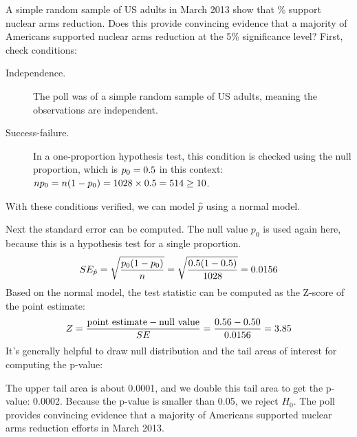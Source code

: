 \begin{examplewrap}
\begin{nexample}{A simple random sample of
    \gallupnucleararmspollsize{} US adults
    in March 2013 show that
    \gallupnucleararmspollpercent{}\% support nuclear arms
    reduction.
    Does this provide convincing evidence that a majority
    of Americans supported nuclear arms reduction at the
    5\% significance level?} \label{NuclearArmsInferenceExample}
  First, check conditions:
  \begin{description}
  \item[Independence.] The poll was of a simple random sample
      of US adults, meaning the observations are independent.
  \item[Success-failure.] In a one-proportion hypothesis test,
      this condition is checked using the null proportion,
      which is $p_0 = 0.5{}$
      in this context:
      $n p_0 = n (1 - p_0)
          = 1028{} \times
              0.5{}
          = 514{} \geq 10$.
  \end{description}
  With these conditions verified,
  we can model $\hat{p}$ using a normal model.

  Next the standard error can be computed.
  The null value $p_0$ is used again here,
  because this is a hypothesis test for a single proportion.
  \begin{align*}
  SE_{\hat{p}}
      = \sqrt{\frac{p_0 (1 - p_0)}{n}}
      = \sqrt{\frac{0.5{}
          (1 - 0.5{})}
          {1028{}}}
      = 0.0156{}
  \end{align*}
  Based on the normal model, the test statistic can be
  computed as the Z-score of the point estimate:
  \begin{align*}
  Z = \frac{\text{point estimate} - \text{null value}}{SE}
      = \frac{0.56{} - 0.50}
          {0.0156{}}
      = 3.85
  \end{align*}
  It's generally helpful to draw null distribution and
  the tail areas of interest for computing the p-value:
  \begin{center}
  \end{center}
  The upper tail area is about 0.0001,
  and we double this tail area to get the p-value: 0.0002.
  Because the p-value is smaller than 0.05, we reject $H_0$.
  The poll provides convincing evidence that a majority
  of Americans supported nuclear arms reduction efforts
  in March 2013.
\end{nexample}
\end{examplewrap}

